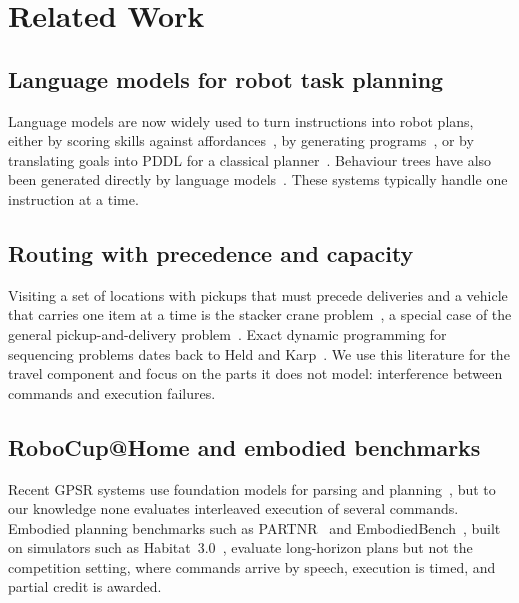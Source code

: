 \documentclass[conference]{IEEEtran}
\newcommand{\todo}[1]{}
\newcommand{\todo}[1]{\textcolor{red}{[TODO: #1]}}
\begin{document}
\section{Related Work}

\subsection{Language models for robot task planning}
Language models are now widely used to turn instructions into robot plans,
either by scoring skills against affordances~\cite{saycan}, by generating
programs~\cite{progprompt}, or by translating goals into PDDL for a classical
planner~\cite{llmp}. Behaviour trees have also been generated directly by
language models~\cite{btgenbot}. These systems typically handle one
instruction at a time. \todo{Add work on multi-instruction or multi-goal
LLM planning, if any is found.}

\subsection{Routing with precedence and capacity}
Visiting a set of locations with pickups that must precede deliveries and a
vehicle that carries one item at a time is the stacker crane
problem~\cite{frederickson1978}, a special case of the general
pickup-and-delivery problem~\cite{savelsbergh1995}. Exact dynamic programming
for sequencing problems dates back to Held and Karp~\cite{heldkarp1962}. We
use this literature for the travel component and focus on the parts it does
not model: interference between commands and execution failures.

\subsection{RoboCup@Home and embodied benchmarks}
Recent GPSR systems use foundation models for parsing and
planning~\cite{nimbro2024,gpsrfm2023,prompteng2024}, but to our knowledge none
evaluates interleaved execution of several commands. Embodied planning
benchmarks such as PARTNR~\cite{partnr} and EmbodiedBench~\cite{embodiedbench},
built on simulators such as Habitat~3.0~\cite{habitat3}, evaluate long-horizon
plans but not the competition setting, where commands arrive by speech,
execution is timed, and partial credit is awarded. \todo{Check for RoboCup@Home
simulation league work (e.g.\ SIGVerse / DSPL simulator) and cite.}
\end{document}
